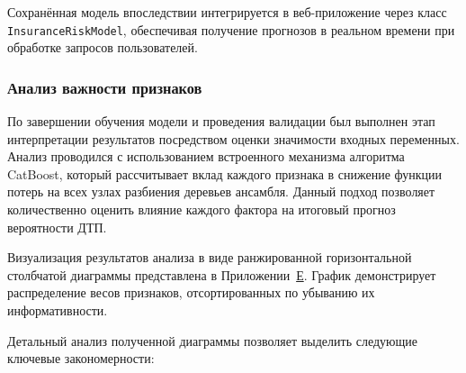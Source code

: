Сохранённая модель впоследствии интегрируется в веб-приложение через класс \texttt{InsuranceRiskModel}, обеспечивая получение прогнозов в реальном времени при обработке запросов пользователей.

\subsubsection{Анализ важности признаков}

По завершении обучения модели и проведения валидации был выполнен этап интерпретации результатов посредством оценки значимости входных переменных. Анализ проводился с использованием встроенного механизма алгоритма CatBoost, который рассчитывает вклад каждого признака в снижение функции потерь на всех узлах разбиения деревьев ансамбля. Данный подход позволяет количественно оценить влияние каждого фактора на итоговый прогноз вероятности ДТП.

Визуализация результатов анализа в виде ранжированной горизонтальной столбчатой диаграммы представлена в Приложении~\hyperref[app:importance]{Е}. График демонстрирует распределение весов признаков, отсортированных по убыванию их информативности.

Детальный анализ полученной диаграммы позволяет выделить следующие ключевые закономерности:

